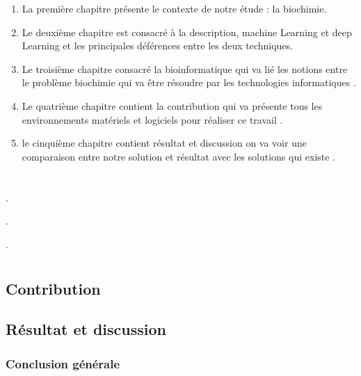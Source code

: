 \documentclass[12pt]{report}
\begin{document}
\begin{enumerate}
\item La première chapitre présente le contexte de notre étude : la biochimie.
\item Le deuxième chapitre est consacré à la description, machine Learning et deep Learning et les principales déférences entre les deux techniques.
\item Le troisième chapitre consacré la bioinformatique qui  va lié les notions entre le problème biochimie  qui va être  résoudre par les technologies informatiques . 
\item Le quatrième chapitre contient la contribution qui va présente tous les environnements matériels et logiciels pour réaliser ce travail .
\item le cinquième chapitre contient résultat et discussion on va voir une comparaison entre notre solution et résultat avec les solutions qui existe .   

\end{enumerate}





\part{}

\newpage
 .

\newpage
.

\newpage
.
\part{}
\chapter{Contribution}
\chapter{Résultat et discussion}
\newpage
\section*{Conclusion générale}
\newpage


\end{document}
